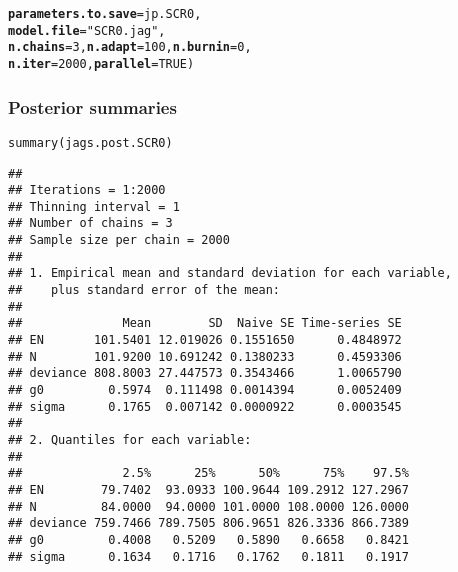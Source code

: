 \documentclass[color=usenames,dvipsnames]{beamer}\usepackage[]{graphicx}\usepackage[]{color}
\makeatletter
\newcommand{\hlnum}[1]{\textcolor[rgb]{0.69,0.494,0}{#1}}%
\newcommand{\hlstr}[1]{\textcolor[rgb]{0.749,0.012,0.012}{#1}}%
\newcommand{\hlstd}[1]{\textcolor[rgb]{0,0,0}{#1}}%
\newcommand{\hlkwc}[1]{\textcolor[rgb]{0,0,0}{\textbf{#1}}}%
\newcommand{\hlkwd}[1]{\textcolor[rgb]{0.004,0.004,0.506}{#1}}%
\newenvironment{kframe}{%
 \def\at@end@of@kframe{}%
 \ifinner\ifhmode%
  \def\at@end@of@kframe{\end{minipage}}%
  \begin{minipage}{\columnwidth}%
 \fi\fi%
 \def\FrameCommand##1{\hskip\@totalleftmargin \hskip-\fboxsep
 \colorbox{shadecolor}{##1}\hskip-\fboxsep
     \hskip-\linewidth \hskip-\@totalleftmargin \hskip\columnwidth}%
 \MakeFramed {\advance\hsize-\width
   \@totalleftmargin\z@ \linewidth\hsize
   \@setminipage}}%
 {\par\unskip\endMakeFramed%
 \at@end@of@kframe}
\newenvironment{knitrout}{}{} %
\makeatother
\begin{document}
\begin{frame}[fragile]
\begin{knitrout}
\begin{kframe}
\begin{alltt}
                             \hlkwc{parameters.to.save}\hlstd{=jp.SCR0,}
                             \hlkwc{model.file}\hlstd{=}\hlstr{"SCR0.jag"}\hlstd{,}
                             \hlkwc{n.chains}\hlstd{=}\hlnum{3}\hlstd{,} \hlkwc{n.adapt}\hlstd{=}\hlnum{100}\hlstd{,} \hlkwc{n.burnin}\hlstd{=}\hlnum{0}\hlstd{,}
                             \hlkwc{n.iter}\hlstd{=}\hlnum{2000}\hlstd{,} \hlkwc{parallel}\hlstd{=}\hlnum{TRUE}\hlstd{)}
\end{alltt}
\end{kframe}
\end{knitrout}
\end{frame}




\begin{frame}[fragile]
  \frametitle{Posterior summaries}
\begin{knitrout}\tiny
{}\color{fgcolor}\begin{kframe}
\begin{alltt}
\hlkwd{summary}\hlstd{(jags.post.SCR0)}
\end{alltt}
\begin{verbatim}
## 
## Iterations = 1:2000
## Thinning interval = 1 
## Number of chains = 3 
## Sample size per chain = 2000 
## 
## 1. Empirical mean and standard deviation for each variable,
##    plus standard error of the mean:
## 
##              Mean        SD  Naive SE Time-series SE
## EN       101.5401 12.019026 0.1551650      0.4848972
## N        101.9200 10.691242 0.1380233      0.4593306
## deviance 808.8003 27.447573 0.3543466      1.0065790
## g0         0.5974  0.111498 0.0014394      0.0052409
## sigma      0.1765  0.007142 0.0000922      0.0003545
## 
## 2. Quantiles for each variable:
## 
##              2.5%      25%      50%      75%    97.5%
## EN        79.7402  93.0933 100.9644 109.2912 127.2967
## N         84.0000  94.0000 101.0000 108.0000 126.0000
## deviance 759.7466 789.7505 806.9651 826.3336 866.7389
## g0         0.4008   0.5209   0.5890   0.6658   0.8421
## sigma      0.1634   0.1716   0.1762   0.1811   0.1917
\end{verbatim}
\end{kframe}
\end{knitrout}
\end{frame}
\end{document}
